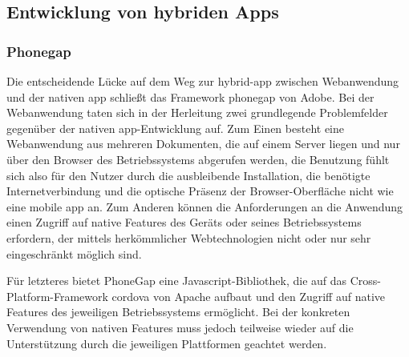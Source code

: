 \subsection{Entwicklung von hybriden Apps}\label{hybrid}

\begin{comment}
\subsection{Grundlegende Technologien}
Konkret heißt das, die Software wird als Webanwendung mit den zugehörigen Technologien (\gls{html}}, Javascript, \gls{css}) entwickelt und für die jeweiligen benötigten Plattformen in eine native \gls{app} eingebettet, welche hier allerdings hauptsächlich aus einer Web-View, also einer abgespeckten Variante eines Web-Browsers zur Anzeige der Webanwendung, besteht. Da dieser Ansatz der am häufigsten von Cross-Platform-Frameworks genutzte ist, \todo{nachweis!} stellt dieser auch den Schwerpunkt der in dieser Arbeit explorierten Technologien dar und soll hier näher erläutert werden. 
\end{comment}

\subsubsection{Phonegap}
Die entscheidende Lücke auf dem Weg zur \gls{hybrid-app} zwischen Webanwendung und der nativen \gls{app} schließt das Framework \gls{phonegap} von Adobe. 
Bei der Webanwendung taten sich in der Herleitung zwei grundlegende Problemfelder gegenüber der nativen \gls{app}-Entwicklung auf. 
Zum Einen besteht eine Webanwendung aus mehreren Dokumenten, die auf einem Server liegen und nur über den Browser des Betriebssystems abgerufen werden, die Benutzung fühlt sich also für den Nutzer durch die ausbleibende Installation, die benötigte Internetverbindung und die optische Präsenz der Browser-Oberfläche nicht wie eine mobile \gls{app} an. 
Zum Anderen können die Anforderungen an die Anwendung einen Zugriff auf native Features des Geräts oder seines Betriebssystems erfordern, der mittels herkömmlicher Webtechnologien nicht oder nur sehr eingeschränkt möglich sind. 

Für letzteres bietet PhoneGap eine Javascript-Bibliothek, die auf das Cross-Platform-Framework \gls{cordova} von Apache aufbaut und den Zugriff auf native Features des jeweiligen Betriebssystems ermöglicht. 
Bei der konkreten Verwendung von nativen Features muss jedoch teilweise wieder auf die Unterstützung durch die jeweiligen Plattformen geachtet werden. 

